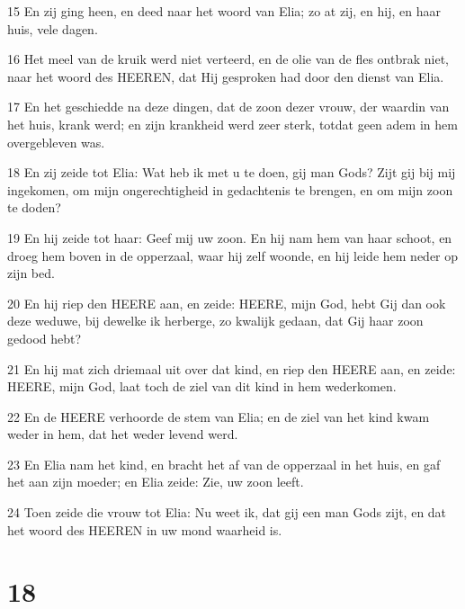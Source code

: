 \par 15 En zij ging heen, en deed naar het woord van Elia; zo at zij, en hij, en haar huis, vele dagen.
\par 16 Het meel van de kruik werd niet verteerd, en de olie van de fles ontbrak niet, naar het woord des HEEREN, dat Hij gesproken had door den dienst van Elia.
\par 17 En het geschiedde na deze dingen, dat de zoon dezer vrouw, der waardin van het huis, krank werd; en zijn krankheid werd zeer sterk, totdat geen adem in hem overgebleven was.
\par 18 En zij zeide tot Elia: Wat heb ik met u te doen, gij man Gods? Zijt gij bij mij ingekomen, om mijn ongerechtigheid in gedachtenis te brengen, en om mijn zoon te doden?
\par 19 En hij zeide tot haar: Geef mij uw zoon. En hij nam hem van haar schoot, en droeg hem boven in de opperzaal, waar hij zelf woonde, en hij leide hem neder op zijn bed.
\par 20 En hij riep den HEERE aan, en zeide: HEERE, mijn God, hebt Gij dan ook deze weduwe, bij dewelke ik herberge, zo kwalijk gedaan, dat Gij haar zoon gedood hebt?
\par 21 En hij mat zich driemaal uit over dat kind, en riep den HEERE aan, en zeide: HEERE, mijn God, laat toch de ziel van dit kind in hem wederkomen.
\par 22 En de HEERE verhoorde de stem van Elia; en de ziel van het kind kwam weder in hem, dat het weder levend werd.
\par 23 En Elia nam het kind, en bracht het af van de opperzaal in het huis, en gaf het aan zijn moeder; en Elia zeide: Zie, uw zoon leeft.
\par 24 Toen zeide die vrouw tot Elia: Nu weet ik, dat gij een man Gods zijt, en dat het woord des HEEREN in uw mond waarheid is.

\chapter{18}

